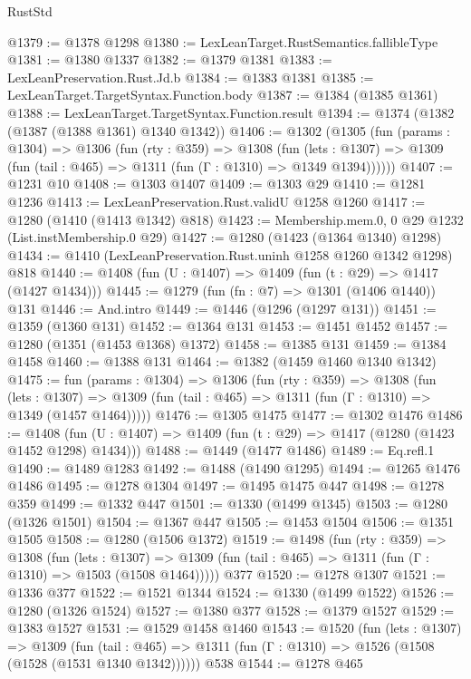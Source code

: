 \begin{lexlean}{RustStd}
\begin{coremodule}
@1379 := @1378 @1298
@1380 := LexLeanTarget.RustSemantics.fallibleType
@1381 := @1380 @1337
@1382 := @1379 @1381
@1383 := LexLeanPreservation.Rust.Jd.b
@1384 := @1383 @1381
@1385 := LexLeanTarget.TargetSyntax.Function.body
@1387 := @1384 (@1385 @1361)
@1388 := LexLeanTarget.TargetSyntax.Function.result
@1394 := @1374 (@1382 (@1387 (@1388 @1361) @1340 @1342))
@1406 := @1302
    (@1305
      (fun (params : @1304) =>
      @1306
        (fun (rty : @359) =>
        @1308
          (fun (lets : @1307) =>
          @1309 (fun (tail : @465) => @1311 (fun (Γ : @1310) => @1349 @1394))))))
@1407 := @1231 @10
@1408 := @1303 @1407
@1409 := @1303 @29
@1410 := @1281 @1236
@1413 := LexLeanPreservation.Rust.validU @1258 @1260
@1417 := @1280 (@1410 (@1413 @1342) @818)
@1423 := Membership.mem.{0, 0} @29 @1232 (List.instMembership.{0} @29)
@1427 := @1280 (@1423 (@1364 @1340) @1298)
@1434 := @1410 (LexLeanPreservation.Rust.uninh @1258 @1260 @1342 @1298) @818
@1440 := @1408 (fun (U : @1407) => @1409 (fun (t : @29) => @1417 (@1427 @1434)))
@1445 := @1279 (fun (fn : @7) => @1301 (@1406 @1440)) @131
@1446 := And.intro
@1449 := @1446 (@1296 (@1297 @131))
@1451 := @1359 (@1360 @131)
@1452 := @1364 @131
@1453 := @1451 @1452
@1457 := @1280 (@1351 (@1453 @1368) @1372)
@1458 := @1385 @131
@1459 := @1384 @1458
@1460 := @1388 @131
@1464 := @1382 (@1459 @1460 @1340 @1342)
@1475 := fun (params : @1304) =>
  @1306
    (fun (rty : @359) =>
    @1308
      (fun (lets : @1307) =>
      @1309 (fun (tail : @465) => @1311 (fun (Γ : @1310) => @1349 (@1457 @1464)))))
@1476 := @1305 @1475
@1477 := @1302 @1476
@1486 := @1408 (fun (U : @1407) => @1409 (fun (t : @29) => @1417 (@1280 (@1423 @1452 @1298) @1434)))
@1488 := @1449 (@1477 @1486)
@1489 := Eq.refl.{1}
@1490 := @1489 @1283
@1492 := @1488 (@1490 @1295)
@1494 := @1265 @1476 @1486
@1495 := @1278 @1304
@1497 := @1495 @1475 @447
@1498 := @1278 @359
@1499 := @1332 @447
@1501 := @1330 (@1499 @1345)
@1503 := @1280 (@1326 @1501)
@1504 := @1367 @447
@1505 := @1453 @1504
@1506 := @1351 @1505
@1508 := @1280 (@1506 @1372)
@1519 := @1498
    (fun (rty : @359) =>
    @1308
      (fun (lets : @1307) =>
      @1309 (fun (tail : @465) => @1311 (fun (Γ : @1310) => @1503 (@1508 @1464)))))
    @377
@1520 := @1278 @1307
@1521 := @1336 @377
@1522 := @1521 @1344
@1524 := @1330 (@1499 @1522)
@1526 := @1280 (@1326 @1524)
@1527 := @1380 @377
@1528 := @1379 @1527
@1529 := @1383 @1527
@1531 := @1529 @1458 @1460
@1543 := @1520
    (fun (lets : @1307) =>
    @1309
      (fun (tail : @465) => @1311 (fun (Γ : @1310) => @1526 (@1508 (@1528 (@1531 @1340 @1342))))))
    @538
@1544 := @1278 @465

\end{coremodule}
\end{lexlean}

